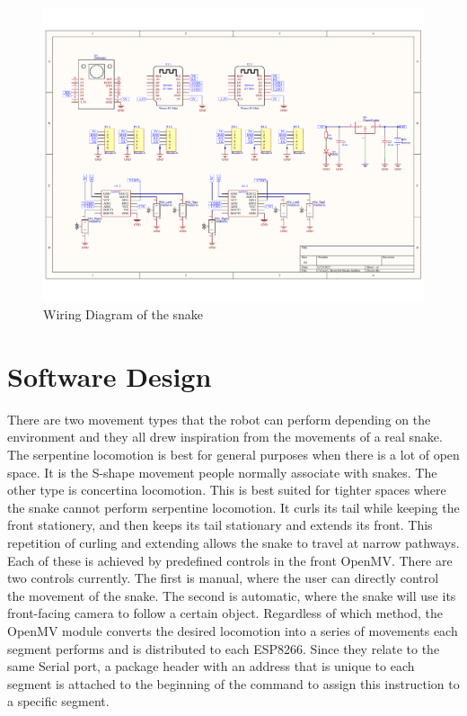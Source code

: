 \documentclass[twoside]{article}
\begin{document}
\begin{figure} [H]
\centering
	\includegraphics[width=\linewidth]{electric circuit diagram}
	\caption{Wiring Diagram of the snake}
\end{figure}

\section{Software Design}
There are two movement types that the robot can perform depending on the environment and they all drew inspiration from the movements of a real snake. The serpentine locomotion is best for general purposes when there is a lot of open space. It is the S-shape movement people normally associate with snakes. The other type is concertina locomotion. This is best suited for tighter spaces where the snake cannot perform serpentine locomotion. It curls its tail while keeping the front stationery, and then keeps its tail stationary and extends its front. This repetition of curling and extending allows the snake to travel at narrow pathways. Each of these is achieved by predefined controls in the front OpenMV. There are two controls currently. The first is manual, where the user can directly control the movement of the snake. The second is automatic, where the snake will use its front-facing camera to follow a certain object. Regardless of which method, the OpenMV module converts the desired locomotion into a series of movements each segment performs and is distributed to each ESP8266. Since they relate to the same Serial port, a package header with an address that is unique to each segment is attached to the beginning of the command to assign this instruction to a specific segment. 
\end{document}
